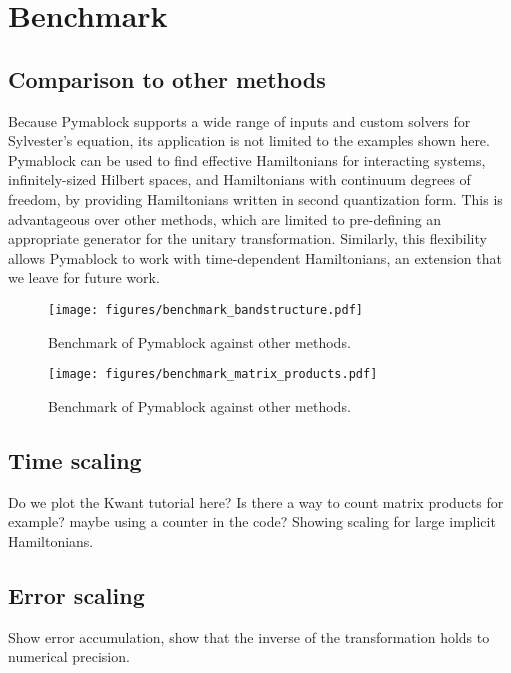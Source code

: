\section{Benchmark}

\subsection{Comparison to other methods}

Because Pymablock supports a wide range of inputs and custom solvers for
Sylvester's equation, its application is not limited to the examples shown
here.
Pymablock can be used to find effective Hamiltonians for interacting systems,
infinitely-sized Hilbert spaces, and Hamiltonians with continuum degrees of
freedom, by providing Hamiltonians written in second quantization form.
This is advantageous over other methods, which are limited to pre-defining
an appropriate generator for the unitary transformation.
Similarly, this flexibility allows Pymablock to work with time-dependent
Hamiltonians, an extension that we leave for future work.

\begin{figure}[h]
    \centering
    \texttt{[image: figures/benchmark\_bandstructure.pdf]}
    \caption{Benchmark of Pymablock against other methods.}
    \label{fig:benchmark_bandstructure}
\end{figure}

\begin{figure}[h]
    \centering
    \texttt{[image: figures/benchmark\_matrix\_products.pdf]}
    \caption{Benchmark of Pymablock against other methods.}
    \label{fig:benchmark_matrix_products}
\end{figure}
\subsection{Time scaling}

Do we plot the Kwant tutorial here? Is there a way to count matrix products for
example? maybe using a counter in the code?
Showing scaling for large implicit Hamiltonians.

\subsection{Error scaling}

Show error accumulation, show that the inverse of the transformation holds to numerical precision.
